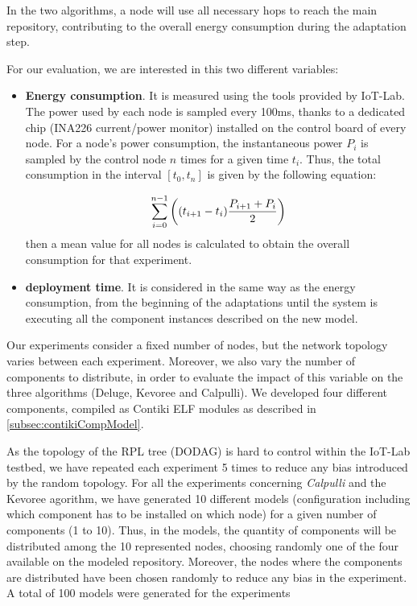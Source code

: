 In the two algorithms, a node will use all necessary hops to reach the main repository, contributing to the overall energy consumption during the adaptation step.

For our evaluation, we are interested in this two different variables:
\begin{itemize}
	\item\textbf{Energy consumption}.
	It is measured using the tools provided by IoT-Lab. 
	The power used by each node is sampled every 100ms, thanks to a dedicated chip (INA226 current/power monitor) installed on the control board of every node.
	For a node's power consumption, the instantaneous power $P_i$ is sampled by the control node $n$ times for a given time $t_i$.
	Thus, the total consumption in the interval $\left[t_0, t_n\right]$ is given by the following equation:
	
	\begin{equation}
	\hspace*{\stretch{1}}
		\sum_{i=0}^{n-1}{\left( (t_{i+1} - t_i) \frac{P_{i+1} + P_i}{2} \right)}
	\hspace*{\stretch{1}}
	\end{equation}
	then a mean value for all nodes is calculated to obtain the overall consumption for that experiment.
	\item\textbf{deployment time}.
	It is considered in the same way as the energy consumption, from the beginning of the adaptations until the system is executing all the component instances described on the new model.
\end{itemize}

Our experiments consider a fixed number of nodes, but the network topology varies between each experiment.
Moreover, we also vary the number of components to distribute, in order to evaluate the impact of this variable on the three algorithms (Deluge, Kevoree and Calpulli).
We developed four different components, compiled as Contiki ELF modules as described in \ref{subsec:contikiCompModel}.

As the topology of the RPL tree (DODAG) is hard to control within the IoT-Lab testbed, we have repeated each experiment 5 times to reduce any bias introduced by the random topology.
For all the experiments concerning \textit{Calpulli} and the Kevoree agorithm, we have generated 10 different models (configuration including which component has to be installed on which node) for a given number of components (1 to 10).
Thus, in the models, the quantity of components will be distributed among the 10 represented nodes, choosing randomly one of the four available on the modeled repository.
Moreover, the nodes where the components are distributed have been chosen randomly to reduce any bias in the experiment.
A total of 100 models were generated for the experiments

